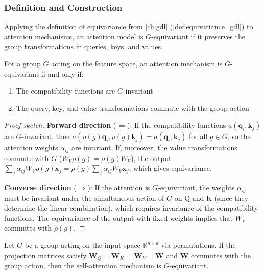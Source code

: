 \subsubsection{Definition and Construction}

Applying the definition of equivariance from \autoref{ch:gdl} (\autoref{def:equivariance_gdl}) to attention mechanisms, an attention model is $G$-equivariant if it preserves the group transformations in queries, keys, and values.

\begin{theorem}
    For a group $G$ acting on the feature space, an attention mechanism is $G$-equivariant if and only if:
    \begin{enumerate}
        \item The compatibility functions are $G$-invariant
        \item The query, key, and value transformations commute with the group action
    \end{enumerate}
\end{theorem}

\begin{proof}[Proof sketch]
\textbf{Forward direction} ($\Leftarrow$): If the compatibility functions $a(\mathbf{q}_i, \mathbf{k}_j)$ are $G$-invariant, then $a(\rho(g)\mathbf{q}_i, \rho(g)\mathbf{k}_j) = a(\mathbf{q}_i, \mathbf{k}_j)$ for all $g \in G$, so the attention weights $\alpha_{ij}$ are invariant. If, moreover, the value transformations commute with $G$ ($W_V \rho(g) = \rho(g) W_V$), the output $\sum_j \alpha_{ij} W_V \rho(g)\mathbf{x}_j = \rho(g) \sum_j \alpha_{ij} W_V \mathbf{x}_j$, which gives equivariance.

\textbf{Converse direction} ($\Rightarrow$): If the attention is $G$-equivariant, the weights $\alpha_{ij}$ must be invariant under the simultaneous action of $G$ on Q and K (since they determine the linear combination), which requires invariance of the compatibility functions. The equivariance of the output with fixed weights implies that $W_V$ commutes with $\rho(g)$.
\end{proof}

\begin{lemma}\label{lemma:self_attention_equivariance}
Let $G$ be a group acting on the input space $\mathbb{R}^{n \times d}$ via permutations.
If the projection matrices satisfy $\mathbf{W}_Q = \mathbf{W}_K = \mathbf{W}_V = \mathbf{W}$
and $\mathbf{W}$ commutes with the group action, then the self-attention mechanism
is $G$-equivariant.
\end{lemma}

